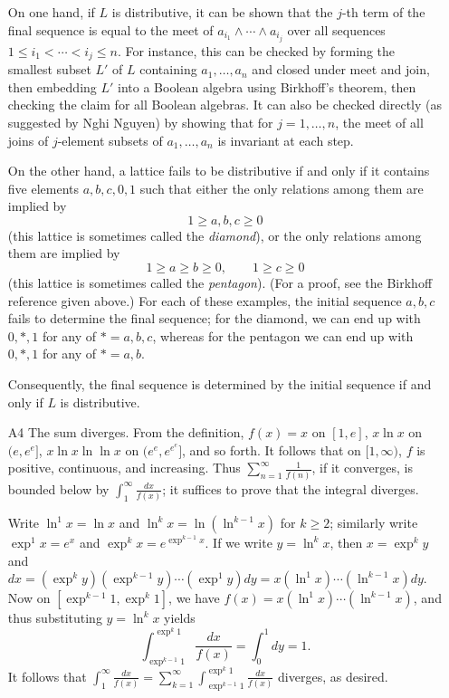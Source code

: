 \documentclass[amssymb,twocolumn,pra,10pt,aps]{revtex4-1}
\begin{document}
\begin{itemize}
On one hand, if $L$ is distributive, it can be shown that the $j$-th term
of the final sequence is equal to the meet of $a_{i_1} \wedge \cdots
\wedge a_{i_j}$ over all sequences $1 \leq i_1 < \cdots < i_j \leq n$.
For instance, this can be checked by forming the smallest subset $L'$
of $L$ containing $a_1,\dots,a_n$ and closed under meet and join,
then embedding $L'$ into a Boolean algebra using
Birkhoff's theorem, then checking the claim for all Boolean algebras.
It can also be checked directly (as suggested by Nghi Nguyen)
by showing that for $j=1,\dots,n$,
the meet of all joins of $j$-element subsets of $a_1,\dots,a_n$ is
invariant at each step.

On the other hand,
a lattice fails to be distributive if and only if
it contains five elements $a,b,c,0,1$ such that either the only relations
among them are implied by
\[
1 \geq a,b,c \geq 0
\]
(this lattice is sometimes called the \emph{diamond}),
or the only relations among them  are implied by
\[
1 \geq a \geq b \geq 0, \qquad 1 \geq c \geq 0
\]
(this lattice is sometimes called the \emph{pentagon}).
(For a proof, see the Birkhoff reference given above.) For each of these
examples, the initial sequence $a,b,c$ fails to determine the final
sequence; for the diamond, we can end up with $0, *, 1$ for
any of $* = a,b,c$, whereas for the pentagon we can end up with
$0, *, 1$ for any of $* = a, b$.

Consequently, the final sequence is determined by the initial sequence
if and only if $L$ is distributive.

\item[A4]
The sum diverges. From the definition, $f(x) = x$ on $[1,e]$, $x\ln x$ on $(e,e^e]$, $x\ln x\ln\ln x$ on $(e^e,e^{e^e}]$, and so forth. It follows that on $[1,\infty)$, $f$ is positive, continuous, and increasing. Thus $\sum_{n=1}^\infty \frac{1}{f(n)}$, if it converges, is bounded below by $\int_1^{\infty} \frac{dx}{f(x)}$; it suffices to prove that the integral diverges.

Write $\ln^1 x  = \ln x $ and $\ln^k x = \ln(\ln^{k-1} x)$ for $k \geq 2$; similarly write $\exp^1 x = e^x$ and $\exp^k x  = e^{\exp^{k-1} x}$. If we write $y = \ln^k x$, then $x = \exp^k y$ and $dx = (\exp^ky)(\exp^{k-1}y)\cdots (\exp^1y)dy =
x(\ln^1 x) \cdots (\ln^{k-1}x)dy$. Now on
$[\exp^{k-1} 1,\exp^k 1]$, we have
$f(x) = x(\ln^1 x) \cdots (\ln^{k-1}x)$, and thus substituting $y=\ln^k x$ yields
\[
\int_{\exp^{k-1} 1}^{\exp^k 1} \frac{dx}{f(x)} =
\int_{0}^{1} dy = 1.
\]
It follows that $\int_1^{\infty} \frac{dx}{f(x)} = \sum_{k=1}^{\infty} \int_{\exp^{k-1} 1}^{\exp^k 1} \frac{dx}{f(x)}$ diverges, as desired.


\end{itemize}
\end{document}
